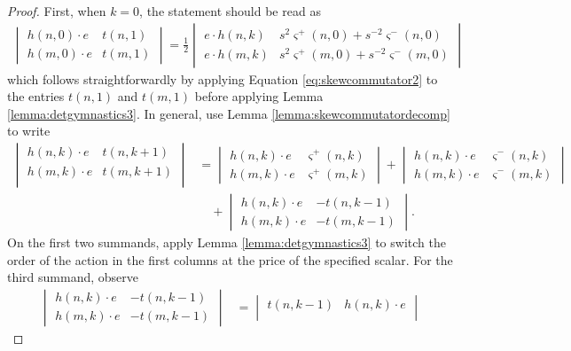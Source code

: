 \begin{proof}
First, when $k=0$, the statement should be read as
\begin{align*}
\begin{vmatrix}
h(n, 0) \cdot e & t(n, 1) \\
h(m, 0) \cdot e & t(m, 1)
\end{vmatrix} 
=
\frac{1}{2}
\begin{vmatrix}
e \cdot h(n, k) & s^2 \varsigma^+ (n, 0) + s^{-2} \varsigma^- (n, 0)\\
e \cdot h(m, k) & s^2 \varsigma^+ (m, 0) + s^{-2} \varsigma^- (m, 0)
\end{vmatrix}
\end{align*}
which follows straightforwardly by applying Equation \ref{eq:skewcommutator2} to the entries $t(n,1)$ and $t(m,1)$ before applying Lemma \ref{lemma:detgymnastics3}. In general, use Lemma \ref{lemma:skewcommutatordecomp} to write 
\begin{align*}
\begin{vmatrix}
h(n, k) \cdot e & t(n, k+1) \\
h(m, k) \cdot e & t(m, k+1) \\
\end{vmatrix}
&=
\begin{vmatrix}
h(n, k) \cdot e & \varsigma^+ (n, k) \\
h(m, k) \cdot e & \varsigma^+ (m, k)
\end{vmatrix}
+
\begin{vmatrix}
h(n, k) \cdot e & \varsigma^- (n, k) \\
h(m, k) \cdot e & \varsigma^- (m, k) 
\end{vmatrix} \\
& \quad +
\begin{vmatrix}
h(n, k) \cdot e & - t(n, k-1)\\
h(m, k) \cdot e & - t(m, k-1)
\end{vmatrix}.
\end{align*}
On the first two summands, apply Lemma \ref{lemma:detgymnastics3} to switch the order of the action in the first columns at the price of the specified scalar. For the third summand, observe
\begin{align*}
\begin{vmatrix}
h(n, k) \cdot e & - t(n, k-1) \\
h(m, k) \cdot e & - t(m, k-1) 
\end{vmatrix}
&=
\begin{vmatrix}
t(n, k-1) & h(n, k) \cdot e \\

\end{vmatrix}
\end{align*}
\end{proof}
